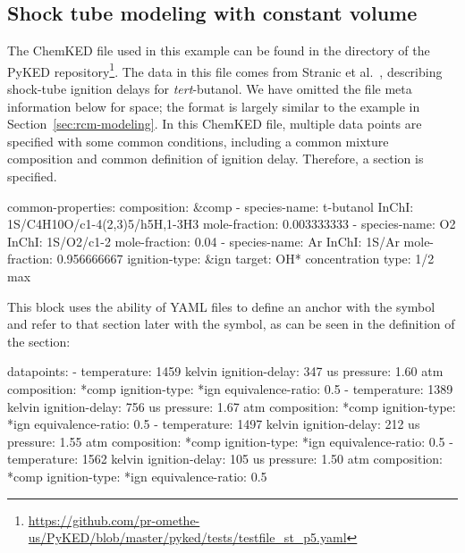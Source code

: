 \documentclass[12pt]{ussci}
\newcommand\ck{ChemKED}
\newcommand\pk{PyKED}
\begin{document}
\subsection{Shock tube modeling with constant volume}\label{sec:shock-tube}

The \ck{} file used in this example can be found in the  directory of the \pk{}
repository\footnote{\url{https://github.com/pr-omethe-us/PyKED/blob/master/pyked/tests/testfile_st_p5.yaml}}.
The data in this file comes from Stranic et al.~\autocite{Stranic:2012}, describing
shock-tube ignition delays for \textit{tert}-butanol. We have omitted the file
meta information below for space; the format is largely similar to the example in Section~\ref{sec:rcm-modeling}.
%
In this \ck{} file, multiple data points are specified with some common
conditions, including a common mixture composition and common definition of
ignition delay. Therefore, a  section is specified.
%
\begin{yamlbox}
common-properties:
  composition: &comp
    - species-name: t-butanol
      InChI: 1S/C4H10O/c1-4(2,3)5/h5H,1-3H3
      mole-fraction: 0.003333333
    - species-name: O2
      InChI:  1S/O2/c1-2
      mole-fraction: 0.04
    - species-name: Ar
      InChI:  1S/Ar
      mole-fraction: 0.956666667
  ignition-type:  &ign
    target: OH* concentration
    type: 1/2 max
\end{yamlbox}
%
This block uses the ability of YAML files to define an anchor with the
\yabox{&} symbol and refer to that section later with the \yabox{*} symbol, as
can be seen in the definition of the  section:
%
\begin{yamlbox}
datapoints:
  - temperature: 1459 kelvin
    ignition-delay: 347 us
    pressure: 1.60 atm
    composition: *comp
    ignition-type: *ign
    equivalence-ratio: 0.5
  - temperature: 1389 kelvin
    ignition-delay: 756 us
    pressure: 1.67 atm
    composition: *comp
    ignition-type: *ign
    equivalence-ratio: 0.5
  - temperature: 1497 kelvin
    ignition-delay: 212 us
    pressure: 1.55 atm
    composition: *comp
    ignition-type: *ign
    equivalence-ratio: 0.5
  - temperature: 1562 kelvin
    ignition-delay: 105 us
    pressure: 1.50 atm
    composition: *comp
    ignition-type: *ign
    equivalence-ratio: 0.5
\end{yamlbox}
\end{document}
